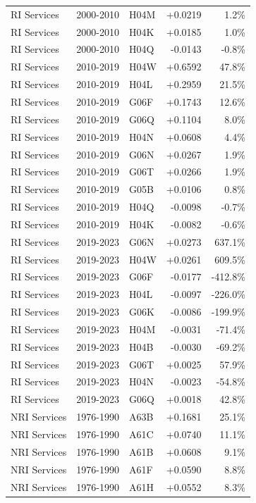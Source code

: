 \begin{tabular}{lllrr}
RI Services & 2000-2010 & H04M & +0.0219 & 1.2\% \\
RI Services & 2000-2010 & H04K & +0.0185 & 1.0\% \\
RI Services & 2000-2010 & H04Q & -0.0143 & -0.8\% \\
RI Services & 2010-2019 & H04W & +0.6592 & 47.8\% \\
RI Services & 2010-2019 & H04L & +0.2959 & 21.5\% \\
RI Services & 2010-2019 & G06F & +0.1743 & 12.6\% \\
RI Services & 2010-2019 & G06Q & +0.1104 & 8.0\% \\
RI Services & 2010-2019 & H04N & +0.0608 & 4.4\% \\
RI Services & 2010-2019 & G06N & +0.0267 & 1.9\% \\
RI Services & 2010-2019 & G06T & +0.0266 & 1.9\% \\
RI Services & 2010-2019 & G05B & +0.0106 & 0.8\% \\
RI Services & 2010-2019 & H04Q & -0.0098 & -0.7\% \\
RI Services & 2010-2019 & H04K & -0.0082 & -0.6\% \\
RI Services & 2019-2023 & G06N & +0.0273 & 637.1\% \\
RI Services & 2019-2023 & H04W & +0.0261 & 609.5\% \\
RI Services & 2019-2023 & G06F & -0.0177 & -412.8\% \\
RI Services & 2019-2023 & H04L & -0.0097 & -226.0\% \\
RI Services & 2019-2023 & G06K & -0.0086 & -199.9\% \\
RI Services & 2019-2023 & H04M & -0.0031 & -71.4\% \\
RI Services & 2019-2023 & H04B & -0.0030 & -69.2\% \\
RI Services & 2019-2023 & G06T & +0.0025 & 57.9\% \\
RI Services & 2019-2023 & H04N & -0.0023 & -54.8\% \\
RI Services & 2019-2023 & G06Q & +0.0018 & 42.8\% \\
NRI Services & 1976-1990 & A63B & +0.1681 & 25.1\% \\
NRI Services & 1976-1990 & A61C & +0.0740 & 11.1\% \\
NRI Services & 1976-1990 & A61B & +0.0608 & 9.1\% \\
NRI Services & 1976-1990 & A61F & +0.0590 & 8.8\% \\
NRI Services & 1976-1990 & A61H & +0.0552 & 8.3\% \\

\end{tabular}
